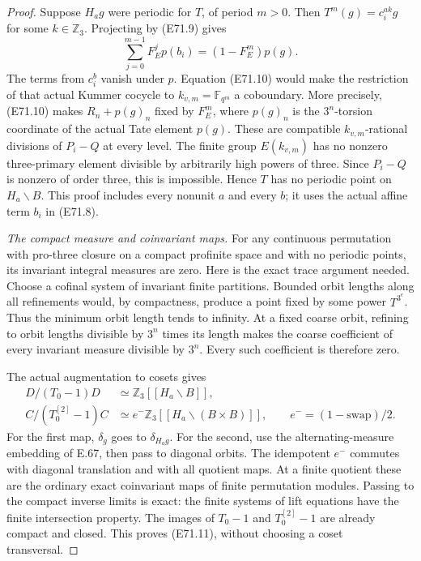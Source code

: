 \begin{proof}
Suppose $H_ag$ were periodic for $T$, of period $m>0$.
Then $T^m(g)=c_i^{ak}g$ for some $k\in\mathbb Z_3$.
Projecting by (E71.9) gives
\[
 \sum_{j=0}^{m-1}F_E^j p(b_i)
                         =(1-F_E^m)p(g).
 \tag{E71.10}
\]
The terms from $c_i^b$ vanish under $p$.
Equation (E71.10) would make the restriction of that
actual Kummer cocycle to $k_{v,m}=\mathbb F_{q^m}$
a coboundary. More precisely, (E71.10) makes
$R_n+p(g)_n$ fixed by $F_E^m$, where $p(g)_n$
is the $3^n$-torsion coordinate of the actual Tate
element $p(g)$. These are compatible
$k_{v,m}$-rational divisions of $P_i-Q$
at every level. The finite group $E(k_{v,m})$ has
no nonzero three-primary element divisible by
arbitrarily high powers of three. Since $P_i-Q$
is nonzero of order three, this is impossible.
Hence $T$ has no periodic point on $H_a\backslash B$.
This proof includes every nonunit $a$ and every $b$;
it uses the actual affine term $b_i$ in (E71.8).

\emph{The compact measure and coinvariant maps.}
For any continuous permutation with pro-three
closure on a compact profinite space and with no
periodic points, its invariant integral measures
are zero. Here is the exact trace argument needed.
Choose a cofinal system of invariant finite
partitions. Bounded orbit lengths along all
refinements would, by compactness, produce a
point fixed by some power $T^{3^e}$. Thus the
minimum orbit length tends to infinity. At a
fixed coarse orbit, refining to orbit lengths
divisible by $3^n$ times its length makes the
coarse coefficient of every invariant measure
divisible by $3^n$. Every such coefficient is
therefore zero.

The actual augmentation to cosets gives
\[
 \begin{split}
 D/(T_0-1)D&\simeq\mathbb Z_3[[H_a\backslash B]],\\
 C/(T_0^{[2]}-1)C
  &\simeq e^-\mathbb Z_3[[H_a\backslash(B\times B)]],
       \qquad e^-=(1-\mathrm{swap})/2.
 \end{split}
 \tag{E71.11}
\]
For the first map, $\delta_g$ goes to $\delta_{H_ag}$.
For the second, use the alternating-measure
embedding of E.67, then pass to diagonal orbits.
The idempotent $e^-$ commutes with diagonal
translation and with all quotient maps. At a
finite quotient these are the ordinary exact
coinvariant maps of finite permutation modules.
Passing to the compact inverse limits is exact:
the finite systems of lift equations have the
finite intersection property. The images of
$T_0-1$ and $T_0^{[2]}-1$ are already compact
and closed. This proves (E71.11), without choosing
a coset transversal.


\end{proof}
